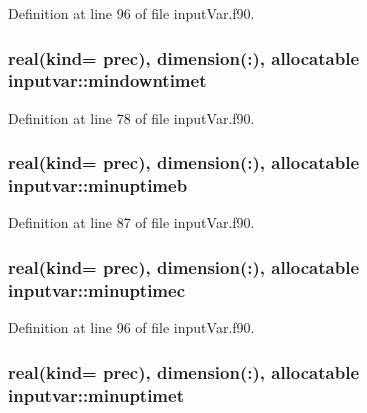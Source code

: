 Definition at line 96 of file input\-Var.\-f90.

\hypertarget{classinputvar_aca351a4427897a65d991d46243fadc34}{
\subsubsection[{mindowntimet}]{\setlength{\rightskip}{0pt plus 5cm}real(kind= prec), dimension(\-:), allocatable inputvar\-::mindowntimet}}\label{classinputvar_aca351a4427897a65d991d46243fadc34}


Definition at line 78 of file input\-Var.\-f90.

\hypertarget{classinputvar_a699644b9b98282661cd55dc10d96dbcb}{
\subsubsection[{minuptimeb}]{\setlength{\rightskip}{0pt plus 5cm}real(kind= prec), dimension(\-:), allocatable inputvar\-::minuptimeb}}\label{classinputvar_a699644b9b98282661cd55dc10d96dbcb}


Definition at line 87 of file input\-Var.\-f90.

\hypertarget{classinputvar_a1c2a4cc32567b94cb7a884d3731bb5f4}{
\subsubsection[{minuptimec}]{\setlength{\rightskip}{0pt plus 5cm}real(kind= prec), dimension(\-:), allocatable inputvar\-::minuptimec}}\label{classinputvar_a1c2a4cc32567b94cb7a884d3731bb5f4}


Definition at line 96 of file input\-Var.\-f90.

\hypertarget{classinputvar_a90d0b599ed6468fc322cf2fbd6b4ec95}{
\subsubsection[{minuptimet}]{\setlength{\rightskip}{0pt plus 5cm}real(kind= prec), dimension(\-:), allocatable inputvar\-::minuptimet}}\label{classinputvar_a90d0b599ed6468fc322cf2fbd6b4ec95}


